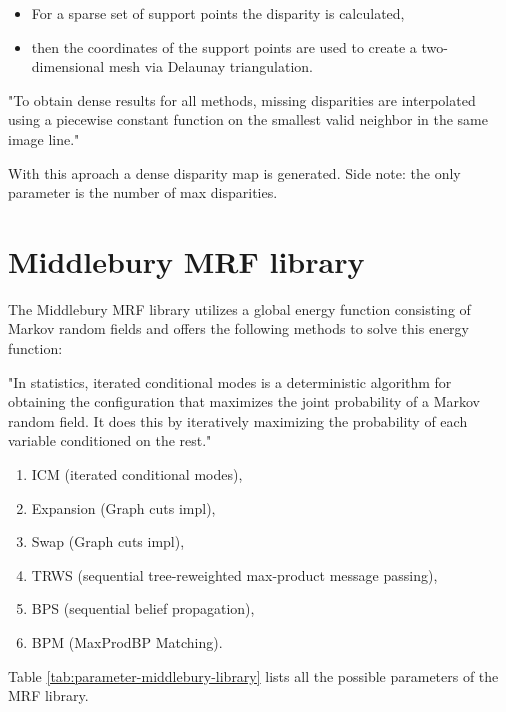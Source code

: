 \begin{itemize}
  \item For a sparse set of support points the disparity is calculated,
  \item then the coordinates of the support points are used to create a two-dimensional mesh via Delaunay triangulation.
\end{itemize}

"To obtain dense results for all methods, missing disparities are interpolated using a piecewise constant function on the smallest valid neighbor in the same image line."

\noindent With this aproach a dense disparity map is generated. Side note: the only parameter is the number of max disparities.

\section{Middlebury MRF library}

The Middlebury MRF library\citep{scharstein2014high, szeliski2008comparative} utilizes a global energy function consisting of Markov random fields and offers the following methods to solve this energy function:

"In statistics, iterated conditional modes is a deterministic algorithm for obtaining the configuration that maximizes the joint probability of a Markov random field. It does this by iteratively maximizing the probability of each variable conditioned on the rest."

\begin{enumerate}
  \item ICM (iterated conditional modes),
  \item Expansion (Graph cuts impl),
  \item Swap (Graph cuts impl),
  \item TRWS (sequential tree-reweighted max-product message passing),
  \item BPS (sequential belief propagation),
  \item BPM (MaxProdBP Matching).
\end{enumerate}

\noindent Table \ref{tab:parameter-middlebury-library} lists all the possible parameters of the MRF library.

